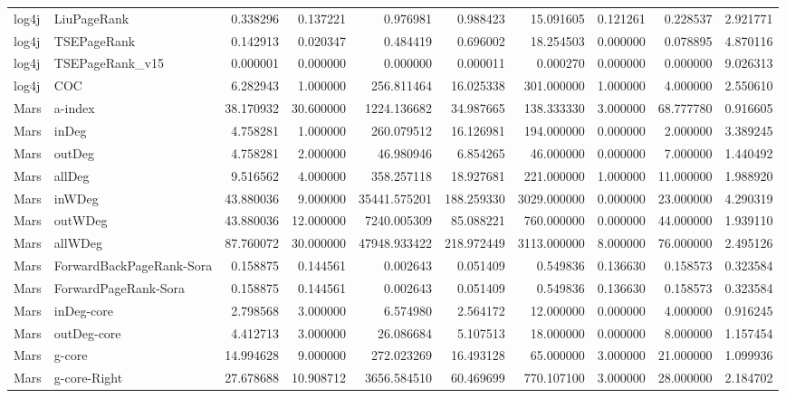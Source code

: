 \begin{tabular}{llrrrrrrrr}
log4j & LiuPageRank & 0.338296 & 0.137221 & 0.976981 & 0.988423 & 15.091605 & 0.121261 & 0.228537 & 2.921771 \\
log4j & TSEPageRank & 0.142913 & 0.020347 & 0.484419 & 0.696002 & 18.254503 & 0.000000 & 0.078895 & 4.870116 \\
log4j & TSEPageRank_v15 & 0.000001 & 0.000000 & 0.000000 & 0.000011 & 0.000270 & 0.000000 & 0.000000 & 9.026313 \\
log4j & COC & 6.282943 & 1.000000 & 256.811464 & 16.025338 & 301.000000 & 1.000000 & 4.000000 & 2.550610 \\
Mars & a-index & 38.170932 & 30.600000 & 1224.136682 & 34.987665 & 138.333330 & 3.000000 & 68.777780 & 0.916605 \\
Mars & inDeg & 4.758281 & 1.000000 & 260.079512 & 16.126981 & 194.000000 & 0.000000 & 2.000000 & 3.389245 \\
Mars & outDeg & 4.758281 & 2.000000 & 46.980946 & 6.854265 & 46.000000 & 0.000000 & 7.000000 & 1.440492 \\
Mars & allDeg & 9.516562 & 4.000000 & 358.257118 & 18.927681 & 221.000000 & 1.000000 & 11.000000 & 1.988920 \\
Mars & inWDeg & 43.880036 & 9.000000 & 35441.575201 & 188.259330 & 3029.000000 & 0.000000 & 23.000000 & 4.290319 \\
Mars & outWDeg & 43.880036 & 12.000000 & 7240.005309 & 85.088221 & 760.000000 & 0.000000 & 44.000000 & 1.939110 \\
Mars & allWDeg & 87.760072 & 30.000000 & 47948.933422 & 218.972449 & 3113.000000 & 8.000000 & 76.000000 & 2.495126 \\
Mars & ForwardBackPageRank-Sora & 0.158875 & 0.144561 & 0.002643 & 0.051409 & 0.549836 & 0.136630 & 0.158573 & 0.323584 \\
Mars & ForwardPageRank-Sora & 0.158875 & 0.144561 & 0.002643 & 0.051409 & 0.549836 & 0.136630 & 0.158573 & 0.323584 \\
Mars & inDeg-core & 2.798568 & 3.000000 & 6.574980 & 2.564172 & 12.000000 & 0.000000 & 4.000000 & 0.916245 \\
Mars & outDeg-core & 4.412713 & 3.000000 & 26.086684 & 5.107513 & 18.000000 & 0.000000 & 8.000000 & 1.157454 \\
Mars & g-core & 14.994628 & 9.000000 & 272.023269 & 16.493128 & 65.000000 & 3.000000 & 21.000000 & 1.099936 \\
Mars & g-core-Right & 27.678688 & 10.908712 & 3656.584510 & 60.469699 & 770.107100 & 3.000000 & 28.000000 & 2.184702 \\

\end{tabular}
